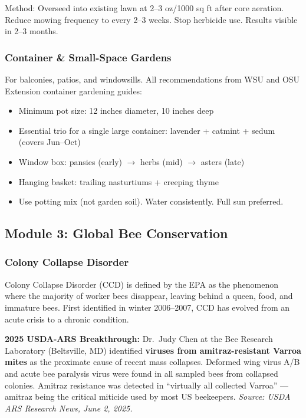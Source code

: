 \documentclass[11pt,letterpaper]{article}
\begin{document}
Method: Overseed into existing lawn at 2--3 oz/1000 sq ft after core aeration. Reduce mowing frequency to every 2--3 weeks. Stop herbicide use. Results visible in 2--3 months.

\subsubsection{Container \& Small-Space Gardens}

For balconies, patios, and windowsills. All recommendations from WSU and OSU Extension container gardening guides:

\begin{itemize}[nosep]
  \item Minimum pot size: 12 inches diameter, 10 inches deep
  \item Essential trio for a single large container: lavender + catmint + sedum (covers Jun--Oct)
  \item Window box: pansies (early) $\rightarrow$ herbs (mid) $\rightarrow$ asters (late)
  \item Hanging basket: trailing nasturtiums + creeping thyme
  \item Use potting mix (not garden soil). Water consistently. Full sun preferred.
\end{itemize}

\subsection{Module 3: Global Bee Conservation}

\subsubsection{Colony Collapse Disorder}

Colony Collapse Disorder (CCD) is defined by the EPA as the phenomenon where the majority of worker bees disappear, leaving behind a queen, food, and immature bees. First identified in winter 2006--2007, CCD has evolved from an acute crisis to a chronic condition.

\textbf{2025 USDA-ARS Breakthrough:} Dr.\ Judy Chen at the Bee Research Laboratory (Beltsville, MD) identified \textbf{viruses from amitraz-resistant Varroa mites} as the proximate cause of recent mass collapses. Deformed wing virus A/B and acute bee paralysis virus were found in all sampled bees from collapsed colonies. Amitraz resistance was detected in ``virtually all collected Varroa'' --- amitraz being the critical miticide used by most US beekeepers. \textit{Source: USDA ARS Research News, June 2, 2025.}
\end{document}
